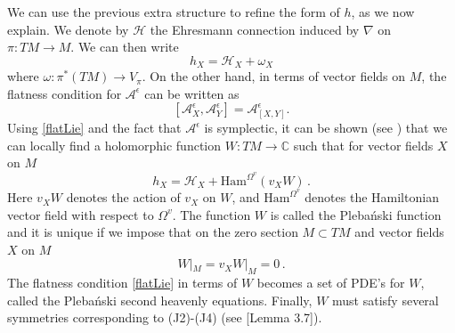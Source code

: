 \documentclass{article}
\theoremstyle{definition}
\numberwithin{equation}{section}
\begin{document}
We can use the previous extra structure to refine the form of $h$, as we now explain. We denote by $\mathcal{H}$ the Ehresmann connection induced by $\nabla$ on $\pi:TM \to M$. We can then write
\begin{equation}
    h_X=\mathcal{H}_X+\omega_X
\end{equation}
where $\omega:\pi^*(TM)\to V_{\pi}$. On the other hand, in terms of vector fields on $M$, the flatness condition for $\mathcal{A}^{\epsilon}$ can be written as
\begin{equation}\label{flatLie}
    [\mathcal{A}^{\epsilon}_X,\mathcal{A}^{\epsilon}_{Y}]=\mathcal{A}^{\epsilon}_{[X,Y]}.
\end{equation}
Using \eqref{flatLie} and the fact that $\mathcal{A}^{\epsilon}$ is symplectic,  it can be shown (see \cite{TwistorJoyce}) that we can locally find a holomorphic function $W: TM \to \mathbb{C}$ such that for vector fields $X$ on $M$
\begin{equation}\label{plebform}
    h_X = \mathcal{H}_X+\text{Ham}^{\Omega^{v}}({v_XW})\,.
\end{equation}
Here $v_XW$ denotes the action of $v_X$ on $W$, and $\text{Ham}^{\Omega^{v}}$ denotes the Hamiltonian vector field with respect to $\Omega^{v}$. The function $W$ is called the Pleba\'nski function and it is unique if we impose that on the zero section $M\subset TM$ and vector fields $X$ on $M$ \begin{equation}\label{plebzerosec}
    W|_M=v_XW|_M=0\,.
\end{equation} 
The flatness condition \eqref{flatLie} in terms of $W$ becomes a set of PDE's for $W$, called the Pleba\'nski second heavenly equations. Finally, $W$ must satisfy several symmetries corresponding to (J2)-(J4) (see [Lemma 3.7]\cite{TwistorJoyce}). 
\end{document}

